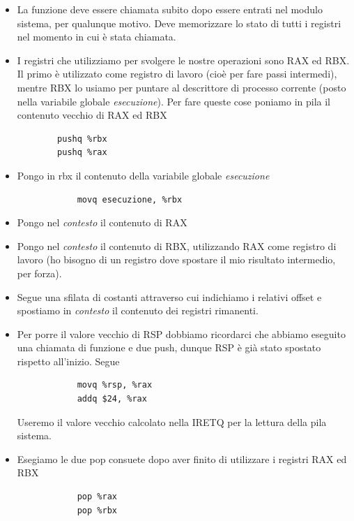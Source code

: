 \documentclass[11pt]{report}
\theoremstyle{definition}
\begin{document}
\begin{itemize}
\item La funzione deve essere chiamata subito dopo essere entrati nel modulo sistema, per qualunque motivo. Deve memorizzare lo stato di tutti i registri nel momento in cui è stata chiamata. 
	\item I registri che utilizziamo per svolgere le nostre operazioni sono RAX ed RBX. Il primo è utilizzato come registro di lavoro (cioè per fare passi intermedi), mentre RBX lo usiamo per puntare al descrittore di processo corrente (posto nella variabile globale \emph{esecuzione}). Per fare queste cose poniamo in pila il contenuto vecchio di RAX ed RBX
	\begin{verbatim}
		pushq %rbx
		pushq %rax
	\end{verbatim}
		\item Pongo in rbx il contenuto della variabile globale \emph{esecuzione} 
		\begin{verbatim}
			movq esecuzione, %rbx
		\end{verbatim}
		\item Pongo nel \emph{contesto} il contenuto di RAX
		\item Pongo nel \emph{contesto} il contenuto di RBX, utilizzando RAX come registro di lavoro (ho bisogno di un registro dove spostare il mio risultato intermedio, per forza).
		\item Segue una sfilata di costanti attraverso cui indichiamo i relativi offset e spostiamo in \emph{contesto} il contenuto dei registri rimanenti.
		\item Per porre il valore vecchio di RSP dobbiamo ricordarci che abbiamo eseguito una chiamata di funzione e due push, dunque RSP è già stato spostato rispetto all'inizio. Segue
		\begin{verbatim}
			movq %rsp, %rax
			addq $24, %rax
		\end{verbatim} Useremo il valore vecchio calcolato nella IRETQ per la lettura della pila sistema.
		\item Esegiamo le due pop consuete dopo aver finito di utilizzare i registri RAX ed RBX
		\begin{verbatim}
			pop %rax
			pop %rbx
		\end{verbatim}
	\end{itemize}
	
\end{document}
